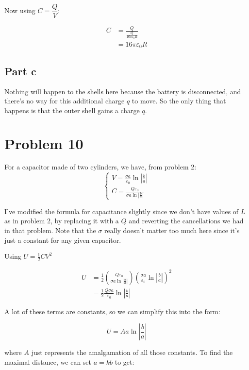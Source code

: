\documentclass{article}
\theoremstyle{definition}
\numberwithin{equation}{section}
\numberwithin{definition}{section}
\begin{document}
    Now using $C = \dfrac{Q}{V}$:

    \begin{align*}
        C &= \frac{Q}{\frac{Q}{16\pi \varepsilon_0 R}}\\
        &= 16\pi \varepsilon_0 R
    \end{align*}

    \subsection{Part c}

    Nothing will happen to the shells here because the battery is disconnected, and there's no way for this additional charge $q$ to move. So the only thing that happens is that the outer shell gains a charge $q$.
    
    \section{Problem 10}

    For a capacitor made of two cylinders, we have, from problem 2:
    \[\begin{cases*}
        V = \frac{\sigma a}{\varepsilon_0} \ln \left|\frac{b}{a}\right|\\
        C = \frac{Q\varepsilon_0}{\sigma a\ln\left|\frac{b}{a}\right|}
    \end{cases*}\]

    I've modified the formula for capacitance slightly since we don't have values of $L$ as in problem 2, by replacing it with a $Q$ and reverting the cancellations we had in that problem. Note that the $\sigma$ really doesn't matter too much here since it's just a constant for any given capacitor.

    Using $U = \frac{1}{2} CV^2$

    \begin{align*}
        U &= \frac{1}{2}\left(\frac{Q\varepsilon_0}{\sigma a\ln \left|\frac{b}{a}\right|}\right)\left(\frac{\sigma a}{\varepsilon_0} \ln \left|\frac{b}{a}\right|\right)^2\\
        &= \frac{1}{2}\frac{Q\sigma a}{\varepsilon_0}\ln \left|\frac{b}{a}\right|
    \end{align*}

    A lot of these terms are constants, so we can simplify this into the form:

    \[ U = A a \ln\left|\frac{b}{a}\right|\]

    where $A$ just represents the amalgamation of all those constants. To find the maximal distance, we can set $a = kb$ to get: 
\end{document}

